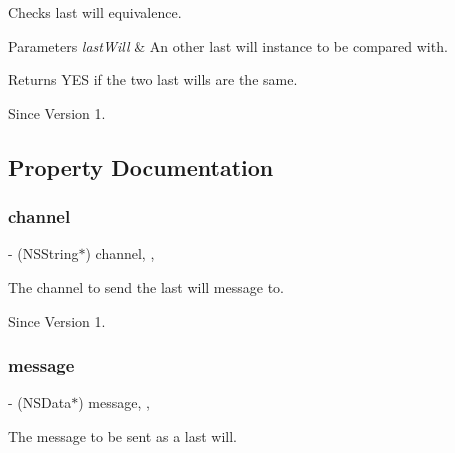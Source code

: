 Checks last will equivalence. 


\begin{DoxyParams}{Parameters}
{\em last\+Will} & An other last will instance to be compared with. \\
\hline
\end{DoxyParams}
\begin{DoxyReturn}{Returns}
Y\+ES if the two last wills are the same. 
\end{DoxyReturn}
\begin{DoxySince}{Since}
Version 1. 
\end{DoxySince}


\subsection{Property Documentation}
\hypertarget{class_x_i_last_will_a975ae65dcc009dd717a824b1ac89e640}{}\label{class_x_i_last_will_a975ae65dcc009dd717a824b1ac89e640} 
\subsubsection{\texorpdfstring{channel}{channel}}
{\footnotesize\ttfamily -\/ (N\+S\+String$\ast$) channel\hspace{0.3cm}{\ttfamily [read]}, {\ttfamily [nonatomic]}, {\ttfamily [copy]}}



The channel to send the last will message to. 

\begin{DoxySince}{Since}
Version 1. 
\end{DoxySince}
\hypertarget{class_x_i_last_will_a3c0ae36d50017d963764de4aaebf78d1}{}\label{class_x_i_last_will_a3c0ae36d50017d963764de4aaebf78d1} 
\subsubsection{\texorpdfstring{message}{message}}
{\footnotesize\ttfamily -\/ (N\+S\+Data$\ast$) message\hspace{0.3cm}{\ttfamily [read]}, {\ttfamily [nonatomic]}, {\ttfamily [copy]}}



The message to be sent as a last will. 

